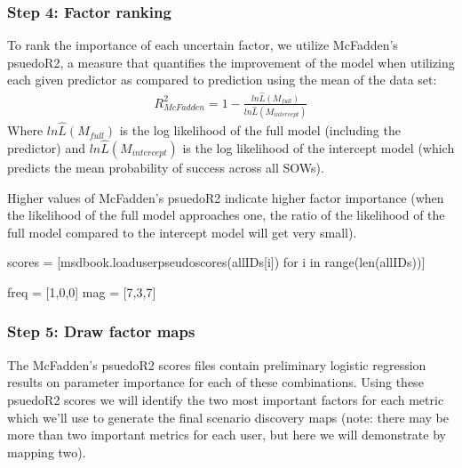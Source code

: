 \documentclass[letterpaper,10pt,english]{book}
\begin{document}
\subsubsection{Step 4: Factor ranking}
\label{\detokenize{A2_Jupyter_Notebooks:step-4-factor-ranking}}
\sphinxAtStartPar
To rank the importance of each uncertain factor, we utilize McFadden’s
psuedo\sphinxhyphen{}R2, a measure that quantifies the improvement of the model when
utilizing each given predictor as compared to prediction using the mean
of the data set:
\begin{equation*}
\begin{split}R^2_{McFadden}=1-\frac{ln \hat{L}(M_{full})}{ln \hat{L}(M_{intercept})}\end{split}
\end{equation*}
\sphinxAtStartPar
Where \(ln \hat{L}(M_{full})\) is the log likelihood of the full
model (including the predictor) and \(ln \hat{L}(M_{intercept})\) is
the log likelihood of the intercept model (which predicts the mean
probability of success across all SOWs).

\sphinxAtStartPar
Higher values of McFadden’s psuedo\sphinxhyphen{}R2 indicate higher factor importance
(when the likelihood of the full model approaches one, the ratio of the
likelihood of the full model compared to the intercept model will get
very small).

\begin{sphinxVerbatim}[commandchars=\\\{\}]
scores = [msdbook.load\PYGZus{}user\PYGZus{}pseudo\PYGZus{}scores(all\PYGZus{}IDs[i]) for i in range(len(all\PYGZus{}IDs))]

freq = [1,0,0]
mag = [7,3,7]
\end{sphinxVerbatim}


\subsubsection{Step 5: Draw factor maps}
\label{\detokenize{A2_Jupyter_Notebooks:step-5-draw-factor-maps}}
\sphinxAtStartPar
The McFadden’s psuedo\sphinxhyphen{}R2 scores files contain preliminary logistic
regression results on parameter importance for each of these
combinations. Using these psuedo\sphinxhyphen{}R2 scores we will identify the two most
important factors for each metric which we’ll use to generate the final
scenario discovery maps (note: there may be more than two important
metrics for each user, but here we will demonstrate by mapping two).
\end{document}
